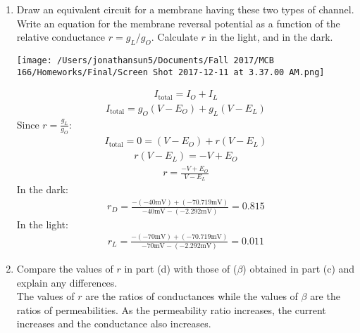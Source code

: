 \documentclass[11pt]{article}
\begin{document}
\begin{enumerate}[label=\arabic*.]
\begin{enumerate}[label=(\alph*)]
\item
Draw an equivalent circuit for a membrane having these two types of channel. Write an equation for the membrane reversal potential as a function of the relative conductance $r = g_L / g_O$. Calculate $r$ in the light, and in the dark.
\begin{center}
\texttt{[image: /Users/jonathansun5/Documents/Fall 2017/MCB 166/Homeworks/Final/Screen Shot 2017-12-11 at 3.37.00 AM.png]}
\end{center}
\begin{align*}
I_{\text{total}} = I_O + I_L
\end{align*}
\begin{align*}
I_{\text{total}} = g_O (V - E_O) + g_L (V - E_L)
\end{align*}
Since $r = \frac{g_L} {g_O}$:
\begin{align*}
I_{\text{total}} = 0 = (V - E_O) + r (V - E_L)
\end{align*}
\begin{align*}
r (V - E_L) = -V + E_O
\end{align*}
\begin{align*}
r = \frac{-V + E_O} {V - E_L}
\end{align*}
In the dark:
\begin{align*}
r_D = \frac{-(-40 \text{mV}) + (-70.719 \text{mV})} {-40 \text{mV} - (-2.292 \text{mV})} = 0.815
\end{align*}
In the light:
\begin{align*}
r_L = \frac{-(-70 \text{mV}) + (-70.719 \text{mV})} {-70 \text{mV} - (-2.292 \text{mV})} = 0.011
\end{align*}



\item
Compare the values of $r$ in part (d) with those of ($\beta$) obtained in part (c) and explain any differences.
\vspace*{1\baselineskip}
\\
The values of $r$ are the ratios of conductances while the values of $\beta$ are the ratios of permeabilities. As the permeability ratio increases, the current increases and the conductance also increases.
\end{enumerate}




\end{enumerate}
\end{document}
